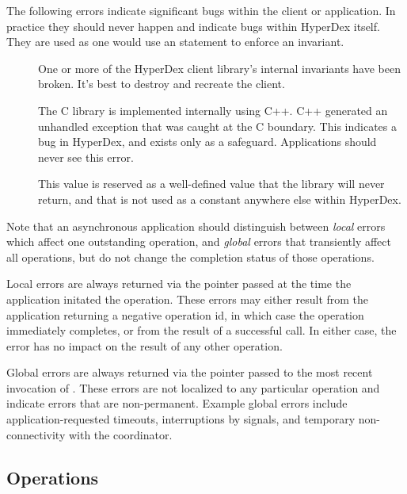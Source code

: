 The following errors indicate significant bugs within the client or application.
In practice they should never happen and indicate bugs within HyperDex itself.
They are used as one would use an  statement to enforce an
invariant.

\begin{description}
\item[] One or more of the HyperDex client
    library's internal invariants have been broken.  It's best to destroy and
    recreate the client.
\item[] The C library is implemented
    internally using C++.  C++ generated an unhandled exception that was caught
    at the C boundary.  This indicates a bug in HyperDex, and exists only as a
    safeguard.  Applications should never see this error.
\item[] This value is reserved as a well-defined
    value that the library will never return, and that is not used as a constant
    anywhere else within HyperDex.
\end{description}

Note that an asynchronous application should distinguish between {\em local}
errors which affect one outstanding operation, and {\em global} errors that
transiently affect all operations, but do not change the completion status of
those operations.

Local errors are always returned via the  pointer passed at the time the application
initated the operation.  These errors may either result from the application
returning a negative operation id, in which case the operation immediately
completes, or from the result of a successful 
call.  In either case, the error has no impact on the result of any other
operation.

Global errors are always returned via the  pointer passed to the most recent invocation of
.  These errors are not localized to any particular
operation and indicate errors that are non-permanent.  Example global errors
include application-requested timeouts, interruptions by signals, and temporary
non-connectivity with the coordinator.

\subsection{Operations}

